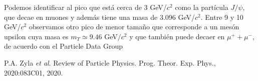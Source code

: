 \documentclass[11pt]{article}
\begin{document}
Podemos identificar al pico que está cerca de 3 GeV/$c^2$ como la partícula $J/\psi$, que decae en muones y además tiene una masa de 3.096 GeV/$c^2$. Entre 9 y 10 GeV/$c^2$ observamos otro pico de menor tamaño que corresponde a un mesón upsilon cuya masa es $m_\Upsilon\simeq 9.46$ GeV$/c^2$ y que también puede decaer en $\mu^+ + \mu^-$, de acuerdo con el Particle Data Group \cite{PDG}

\begin{thebibliography}{}
 P.A. Zyla \textit{et al}. Review of Particle Physics. Prog. Theor. Exp. Phys., 2020:083C01,
2020.
\end{thebibliography}
\end{document}
